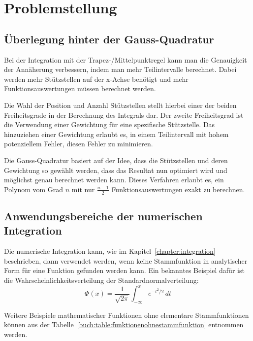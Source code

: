 %
%
%
\section{Problemstellung
\label{quadratur:section:problemstellung}}
\subsection{Überlegung hinter der Gauss-Quadratur \label{quadratur:subsection:ueberlegung}}

Bei der Integration mit der Trapez-/Mittelpunktregel kann man die Genauigkeit
der Annäherung verbessern, indem man mehr Teilintervalle berechnet.
Dabei werden mehr Stützstellen auf der x-Achse benötigt und mehr Funktionsauswertungen
müssen berechnet werden.

Die Wahl der Position und Anzahl Stützstellen stellt hierbei einer der beiden Freiheitsgrade
in der Berechnung des Integrals dar.
Der zweite Freiheitsgrad ist die Verwendung einer Gewichtung für eine spezifische Stützstelle.
Das hinzuziehen einer Gewichtung erlaubt es, in einem Teilintervall mit hohem potenziellem 
Fehler, diesen Fehler zu minimieren. 

Die Gauss-Quadratur basiert auf der Idee, dass die Stützstellen und deren Gewichtung so gewählt werden,
dass das Resultat nun optimiert wird und möglichst genau berechnet werden kann.
Dieses Verfahren erlaubt es, ein Polynom vom Grad $n$ mit nur $\frac{n-1}{2}$
Funktionsauswertungen exakt zu berechnen.

\subsection{Anwendungsbereiche der numerischen Integration \label{quadratur:subsection:anwendungsbereiche}}
Die numerische Integration kann, wie im Kapitel~\ref{chapter:integration} beschrieben, dann verwendet
werden, wenn keine Stammfunktion in analytischer Form für eine Funktion gefunden werden kann.
Ein bekanntes Beispiel dafür ist die Wahrscheinlichkeitsverteilung der Standardnormalverteilung:
\begin{equation}
\Phi(x) 
=
\frac{1}{\sqrt{2\pi}}
\int_{-\infty}^x e^{-t^2/2}\,dt
\end{equation}

Weitere Beispiele mathematischer Funktionen ohne elementare Stammfunktionen können aus 
der Tabelle~\ref{buch:table:funktionenohnestammfunktion} entnommen werden.

